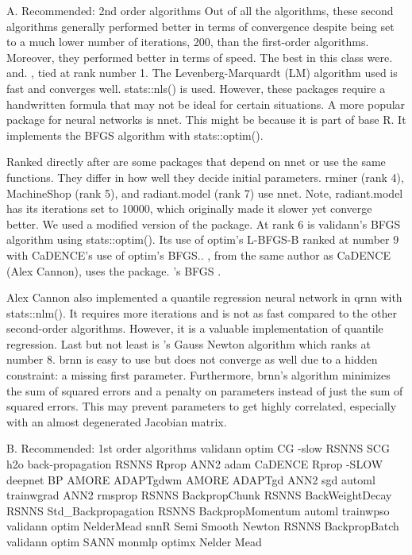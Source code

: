 A. Recommended: 2nd order algorithms Out of all the algorithms, these
second algorithms generally performed better in terms of convergence
despite being set to a much lower number of iterations, 200, than the
first-order algorithms. Moreover, they performed better in terms of
speed. The best in this class were.  and.
, tied at rank number 1. The Levenberg-Marquardt (LM)
algorithm used is fast and converges well. stats::nls() is used.
However, these packages require a handwritten formula that may not be
ideal for certain situations. A more popular package for neural networks
is nnet. This might be because it is part of base R. It implements the
BFGS algorithm with stats::optim().

Ranked directly after are some packages that depend on nnet or use the
same functions. They differ in how well they decide initial parameters.
rminer (rank 4), MachineShop (rank 5), and radiant.model (rank 7) use
nnet. Note, radiant.model has its iterations set to 10000, which
originally made it slower yet converge better. We used a modified
version of the package. At rank 6 is validann's BFGS algorithm using
stats::optim(). Its use of optim's L-BFGS-B ranked at number 9 with
CaDENCE's use of optim's BFGS.. , from the same author
as CaDENCE (Alex Cannon), uses the package. 's BFGS
\citep{R-optimx}.

Alex Cannon also implemented a quantile regression neural network in
qrnn with stats::nlm(). It requires more iterations and is not as fast
compared to the other second-order algorithms. However, it is a valuable
implementation of quantile regression. Last but not least is
's Gauss Newton algorithm which ranks at number 8. brnn is
easy to use but does not converge as well due to a hidden constraint: a
missing first parameter. Furthermore, brnn's algorithm minimizes the sum
of squared errors and a penalty on parameters instead of just the sum of
squared errors. This may prevent parameters to get highly correlated,
especially with an almost degenerated Jacobian matrix.

B. Recommended: 1st order algorithms validann optim CG -slow RSNNS SCG
h2o back-propagation RSNNS Rprop ANN2 adam CaDENCE Rprop -SLOW deepnet
BP AMORE ADAPTgdwm AMORE ADAPTgd ANN2 sgd automl trainwgrad ANN2 rmsprop
RSNNS BackpropChunk RSNNS BackWeightDecay RSNNS Std\_Backpropagation
RSNNS BackpropMomentum automl trainwpso validann optim NelderMead snnR
Semi Smooth Newton RSNNS BackpropBatch validann optim SANN monmlp optimx
Nelder Mead

